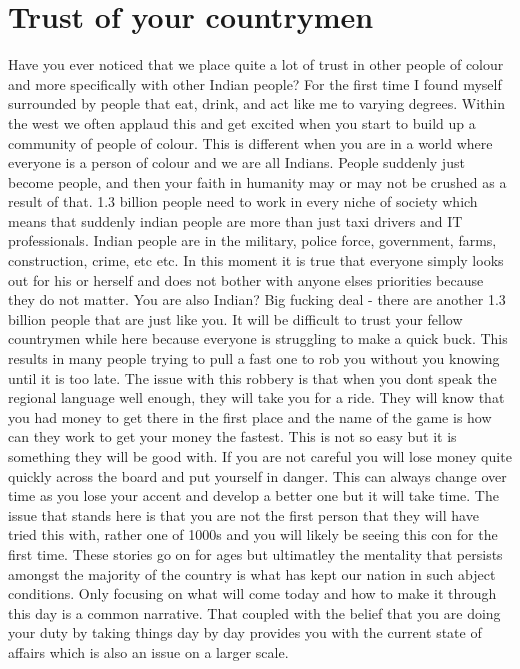 \chapter{Trust of your countrymen}
Have you ever noticed that we place quite a lot of trust in other people of colour and more specifically with other Indian people?  For the first time I found myself surrounded by people that eat, drink, and act like me to varying degrees. Within the west we often applaud this and get excited when you start to build up a community of people of colour. This is different when you are in a world where everyone is a person of colour and we are all Indians. People suddenly just become people, and then your faith in humanity may or may not be crushed as a result of that. 1.3 billion people need to work in every niche of society which means that suddenly indian people are more than just taxi drivers and IT professionals. Indian people are in the military, police force, government, farms, construction, crime, etc etc. In this moment it is true that everyone simply looks out for his or herself and does not bother with anyone elses priorities because they do not matter. You are also Indian? Big fucking deal - there are another 1.3 billion people that are just like you. It will be difficult to trust your fellow countrymen while here because everyone is struggling to make a quick buck. This results in many people trying to pull a fast one to rob you without you knowing until it is too late. The issue with this robbery is that when you dont speak the regional language well enough, they will take you for a ride. They will know that you had money to get there in the first place and the name of the game is how can they work to get your money the fastest. This is not so easy but it is something they will be good with. If you are not careful you will lose money quite quickly across the board and put yourself in danger. This can always change over time as you lose your accent and develop a better one but it will take time. The issue that stands here is that you are not the first person that they will have tried this with, rather one of 1000s and you will likely be seeing this con for the first time. These stories go on for ages but ultimatley the mentality that persists amongst the majority of the country is what has kept our nation in such abject conditions. Only focusing on what will come today and how to make it through this day is a common narrative. That coupled with the belief that you are doing your duty by taking things day by day provides you with the current state of affairs which is also an issue on a larger scale. 